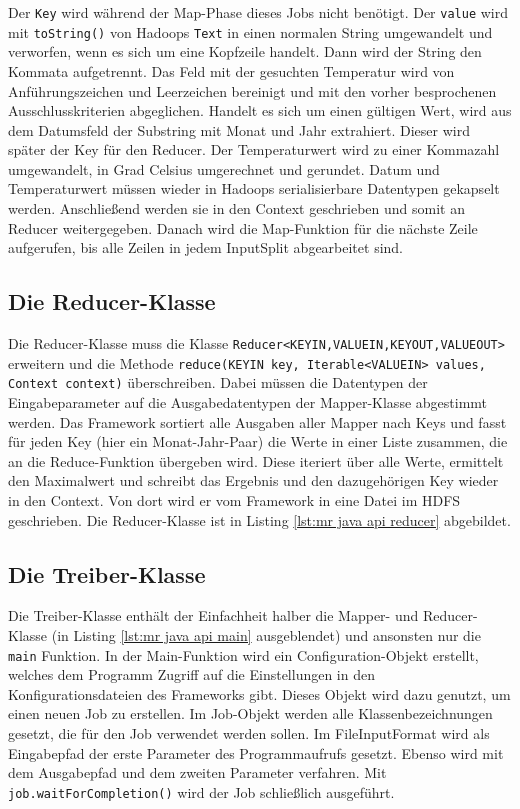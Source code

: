 

Der \verb|Key| wird während der Map-Phase dieses Jobs nicht benötigt. Der \verb|value| wird mit \verb|toString()| von Hadoops \verb|Text| in einen normalen String umgewandelt und verworfen, wenn es sich um eine Kopfzeile handelt. Dann wird der String den Kommata aufgetrennt. Das Feld mit der gesuchten Temperatur wird von Anführungszeichen und Leerzeichen bereinigt und mit den vorher besprochenen Ausschlusskriterien abgeglichen. Handelt es sich um einen gültigen Wert, wird aus dem Datumsfeld der Substring mit Monat und Jahr extrahiert. Dieser wird später der Key für den Reducer. Der Temperaturwert wird zu einer Kommazahl umgewandelt, in Grad Celsius umgerechnet und gerundet. Datum und Temperaturwert müssen wieder in Hadoops serialisierbare Datentypen gekapselt werden. Anschließend werden sie in den Context geschrieben und somit an Reducer weitergegeben. Danach wird die Map-Funktion für die nächste Zeile aufgerufen, bis alle Zeilen in jedem InputSplit abgearbeitet sind.
\pagebreak
\subsection{Die Reducer-Klasse}
Die Reducer-Klasse muss die Klasse \verb|Reducer<KEYIN,VALUEIN,KEYOUT,VALUEOUT>| erweitern und die Methode \verb|reduce(KEYIN key, Iterable<VALUEIN> values,|\\ \verb|Context context)| überschreiben. Dabei müssen die Datentypen der Eingabeparameter auf die Ausgabedatentypen der Mapper-Klasse abgestimmt werden. Das Framework sortiert alle Ausgaben aller Mapper nach Keys und fasst für jeden Key (hier ein Monat-Jahr-Paar) die Werte in einer Liste zusammen, die an die Reduce-Funktion übergeben wird. Diese iteriert über alle Werte, ermittelt den Maximalwert und schreibt das Ergebnis und den dazugehörigen Key wieder in den Context. Von dort wird er vom Framework in eine Datei im HDFS geschrieben. Die Reducer-Klasse ist in Listing \ref{lst:mr java api reducer} abgebildet.



\subsection{Die Treiber-Klasse}
Die Treiber-Klasse enthält der Einfachheit halber die Mapper- und Reducer-Klasse (in Listing \ref{lst:mr java api main} ausgeblendet) und ansonsten nur die \verb|main| Funktion. In der Main-Funktion wird ein Configuration-Objekt erstellt, welches dem Programm Zugriff auf die Einstellungen in den Konfigurationsdateien des Frameworks gibt. Dieses Objekt wird dazu genutzt, um einen neuen Job zu erstellen. Im Job-Objekt werden alle Klassenbezeichnungen gesetzt, die für den Job verwendet werden sollen. Im FileInputFormat wird als Eingabepfad der erste Parameter des Programmaufrufs gesetzt. Ebenso wird mit dem Ausgabepfad und dem zweiten Parameter verfahren. Mit \verb|job.waitForCompletion()| wird der Job schließlich ausgeführt. 

